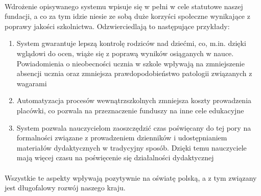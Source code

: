 \documentclass{article}
\begin{document}
\paragraph{}Wdrożenie opisywanego systemu wpisuje się w pełni w cele statutowe naszej fundacji, a co za tym idzie niesie ze sobą duże korzyści społeczne wynikające z poprawy jakości szkolnictwa. Odzwierciedlają to następujące przykłady:
\begin{enumerate}
\item System gwarantuje lepszą kontrolę rodziców nad dziećmi, co, m.in. dzięki wglądowi do ocen, wiąże się z poprawą wyników osiąganych w nauce. Powiadomienia o nieobecności ucznia w szkole wpływają na zmniejszenie absencji ucznia oraz zmniejsza prawdopodobieństwo patologii związanych z wagarami

\item Automatyzacja procesów wewnątrzszkolnych zmniejsza koszty prowadzenia placówki, co pozwala na przeznaczenie funduszy na inne cele edukacyjne

\item System pozwala nauczycielom zaoszczędzić czas poświęcany do tej pory na formalności związane z prowadzeniem dzienników i udostępnianiem materiałów dydaktycznych w tradycyjny sposób. Dzięki temu nauczyciele mają więcej czasu na poświęcenie się działalności dydaktycznej

\end{enumerate}

\paragraph{}Wszystkie te aspekty wpływają pozytywnie na oświatę polską, a z tym związany jest długofalowy rozwój naszego kraju.
\end{document}
